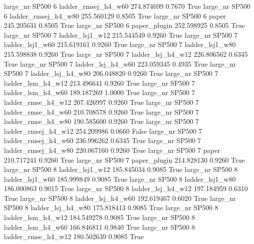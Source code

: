   large_nr    SP500                 6 ladder_rmsej_h4_w60  274.874699      0.7670    True
  large_nr    SP500                 6 ladder_rmsej_h4_w80  255.560129      0.8505    True
  large_nr    SP500                 6               paper  245.205631      0.8505    True
  large_nr    SP500                 6        paper_plugin  252.598925      0.8505    True
  large_nr    SP500                 7     ladder_lsj1_w12  215.544549      0.9260    True
  large_nr    SP500                 7     ladder_lsj1_w60  215.619161      0.9260    True
  large_nr    SP500                 7     ladder_lsj1_w80  215.598838      0.9260    True
  large_nr    SP500                 7   ladder_lsj_h4_w12  226.806562      0.6345    True
  large_nr    SP500                 7   ladder_lsj_h4_w60  223.059345      0.4935    True
  large_nr    SP500                 7   ladder_lsj_h4_w80  206.048820      0.9260    True
  large_nr    SP500                 7   ladder_lsm_h4_w12  213.496641      0.9260    True
  large_nr    SP500                 7   ladder_lsm_h4_w60  189.187269      1.0000    True
  large_nr    SP500                 7  ladder_rmse_h4_w12  207.426997      0.9260    True
  large_nr    SP500                 7  ladder_rmse_h4_w60  210.708578      0.9260    True
  large_nr    SP500                 7  ladder_rmse_h4_w80  190.585600      0.9260    True
  large_nr    SP500                 7 ladder_rmsej_h4_w12  254.209986      0.0660   False
  large_nr    SP500                 7 ladder_rmsej_h4_w60  236.996262      0.6345    True
  large_nr    SP500                 7 ladder_rmsej_h4_w80  220.067160      0.9260    True
  large_nr    SP500                 7               paper  210.717241      0.9260    True
  large_nr    SP500                 7        paper_plugin  214.828130      0.9260    True
  large_nr    SP500                 8     ladder_lsj1_w12  185.845034      0.9085    True
  large_nr    SP500                 8     ladder_lsj1_w60  185.999849      0.9085    True
  large_nr    SP500                 8     ladder_lsj1_w80  186.000863      0.9015    True
  large_nr    SP500                 8   ladder_lsj_h4_w12  197.184959      0.6310    True
  large_nr    SP500                 8   ladder_lsj_h4_w60  192.619467      0.6020    True
  large_nr    SP500                 8   ladder_lsj_h4_w80  175.818413      0.9085    True
  large_nr    SP500                 8   ladder_lsm_h4_w12  184.549278      0.9085    True
  large_nr    SP500                 8   ladder_lsm_h4_w60  166.846811      0.9840    True
  large_nr    SP500                 8  ladder_rmse_h4_w12  180.502639      0.9085    True
